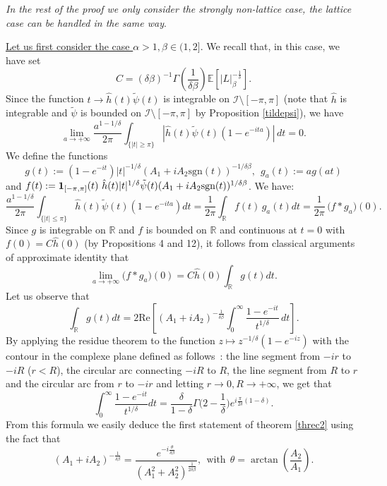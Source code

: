 \documentclass[oneside, a4paper,11pt,reqno]{amsart}
\begin{document}
{\it In the rest of the proof we only consider the strongly non-lattice case, the lattice case can  be handled in the same way}.

\noindent \underline{Let us first consider the case $\alpha>1,\beta\in(1,2]$}. 
We recall that, in this case, we have set 
$$C=(\delta \beta)^{-1} 
 \Gamma(\frac 1{\delta\beta}){\mathbb E}[|L|_\beta^{-\frac 1\delta}].$$
Since the function $t\rightarrow \hat{h}(t) \tilde\psi(t)$ is integrable on 
$\mathcal{I}\setminus[-\pi,\pi]$ (note that $\hat{h}$ is integrable and $\tilde\psi$ is bounded on   
$\mathcal{I}\setminus[-\pi,\pi]$ by Proposition \ref{tildepsi}), we have 
$$ \lim_{a\rightarrow +\infty} \frac{a^{1-1/\delta}}{2\pi} 
  \int_{\{|t|\geq \pi\}} \left| \hat{h} (t) \tilde\psi(t) 
\left( 1- e^{-ita} \right) \right| \, dt = 0.$$
We define the functions
\begin{equation}\label{fonctiong} 
g(t) := (1-e^{-it}) |t|^{-1/\delta}(A_1+iA_2\text{sgn}(t))^{-1/\delta\beta},\ \ 
g_{a}(t) := a g(at)
\end{equation}
and $f(t) := {\bf 1}_{[-\pi,\pi]} (t)\  \hat{h} (t) |t|^{1/\delta} 
\tilde\psi(t)(A_1+iA_2\text{sgn}(t))^{1/\delta\beta}$.   We have: 
$$
\frac{a^{1-1/\delta}}{2\pi} \int_{\{|t|\leq \pi\}} \hat{h} (t) \tilde\psi(t) \left( 1- e^{-ita} \right) dt 
= \frac{1}{2\pi}\int_{\mathbb{R}} f(t)\, g_{a}(t) dt = \frac{1}{2\pi}\, \big(f*g_{a}\big)(0). 
$$
Since $g$ is integrable on $\mathbb{R}$ and $f$ is bounded on $\mathbb{R}$ and continuous at $t=0$ with $f(0) = C\hat{h} (0)$ (by Propositions 4 and 12), it follows  
from classical arguments of approximate identity that 
$$\lim_{a\rightarrow +\infty} (f*g_{a}\big)(0) = C\hat{h} (0)\int_{\mathbb{R}} g(t)dt.$$  
Let us observe that 
$$\int_{\mathbb{R}} g(t) dt = 2 \textrm{Re}\left[(A_1+iA_2)^{-\frac 1{\delta\beta}}
     \int_0^{\infty} \frac{1-e^{-it}}{t^{1/\delta}}\, dt \right].$$
By applying the residue theorem to the function $z\mapsto z^{-1/\delta} 
(1-e^{-iz})$ with the contour in the complexe plane defined as follows~: 
the line segment from  $-ir$ to $-iR$ ($r<R$), the circular arc connecting $-iR$ to $R$, 
the line segment from $R$ to $r$ and the circular arc from $r$ to $-ir$ and letting 
$r\rightarrow 0, R\rightarrow +\infty$, we get that 
$$\int_0^{\infty} \frac{1-e^{-it}}{t^{1/\delta}}dt= \frac{\delta}{1-\delta} \Gamma\Big(2-\frac{1}{\delta}\Big)e^{i\frac{\pi}{2\delta}(1-\delta)}.$$ 
From this formula we easily deduce the first statement of theorem \ref{threc2}
using the fact that
$$(A_1+iA_2)^{-\frac 1{\delta\beta}}=\frac{e^{-i\frac\theta{\delta\beta}}}{(A_1^2+A_2^2)
   ^{\frac 1{2\delta\beta}}},\ \ \mbox{with}\ \ \theta=\arctan\left(\frac {A_2}{A_1}\right).$$
\end{document}
